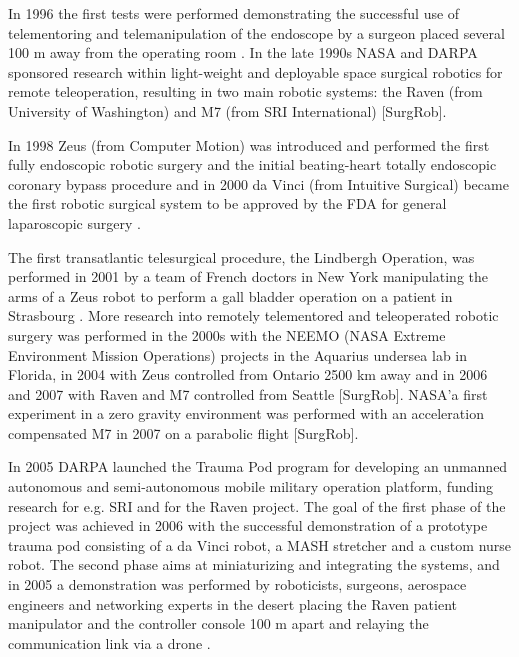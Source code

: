 In 1996 the first tests were performed demonstrating the successful use of telementoring and telemanipulation of the endoscope by a surgeon placed several 100 m away from the operating room \citep{bib:telesurg_history}. 
In the late 1990s NASA and DARPA sponsored research within light-weight and deployable space surgical robotics for remote teleoperation, resulting in two main robotic systems: the Raven (from University of Washington) and M7 (from SRI International) [SurgRob].

In 1998 Zeus (from Computer Motion) was introduced and performed the first fully endoscopic robotic surgery and the initial beating-heart totally endoscopic coronary bypass procedure \citep{bib:brown_univ} and in 2000 da Vinci (from Intuitive Surgical) became the first robotic surgical system  to be approved by the FDA for general laparoscopic surgery \citep{bib:mddi}.

The first transatlantic telesurgical procedure, the Lindbergh Operation, was performed in 2001 by a team of French doctors in New York manipulating the arms of a Zeus robot to perform a gall bladder operation on a patient in Strasbourg \citep{bib:telesurg_history}. More research into remotely telementored and teleoperated robotic surgery was performed in the 2000s with the NEEMO (NASA Extreme Environment Mission Operations) projects in the Aquarius undersea lab in Florida, in 2004 with Zeus controlled from Ontario 2500 km away and in 2006 and 2007 with Raven and M7 controlled from Seattle [SurgRob]. NASA'a first experiment in a zero gravity environment was performed with an acceleration compensated M7 in 2007 on a parabolic flight [SurgRob].

In 2005 DARPA launched the Trauma Pod program for developing an unmanned autonomous and semi-autonomous mobile military operation platform, funding research for e.g. SRI and for the Raven project. The goal of the first phase of the project was achieved in 2006 with the successful demonstration of a prototype trauma pod consisting of a da Vinci robot, a MASH stretcher and a custom nurse robot. The second phase aims at miniaturizing and integrating the systems, and in 2005 a demonstration was performed by roboticists, surgeons, aerospace engineers and networking experts in the desert placing the Raven patient manipulator and the controller console 100 m apart and relaying the communication link via a drone \citep{bib:docatadist}.



%
%

